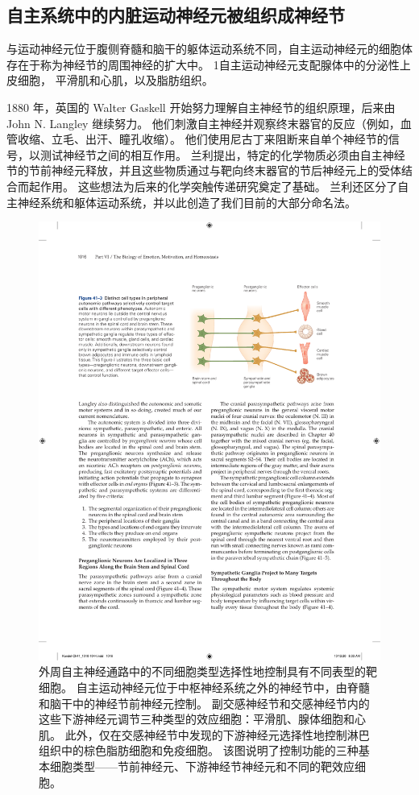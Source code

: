 \subsection{自主系统中的内脏运动神经元被组织成神经节}

与运动神经元位于腹侧脊髓和脑干的躯体运动系统不同，自主运动神经元的细胞体存在于称为神经节的周围神经的扩大中。
1自主运动神经元支配腺体中的分泌性上皮细胞， 平滑肌和心肌，以及脂肪组织。


1880 年，英国的 Walter Gaskell 开始努力理解自主神经节的组织原理，后来由 John N. Langley 继续努力。
他们刺激自主神经并观察终末器官的反应（例如，血管收缩、立毛、出汗、瞳孔收缩）。
他们使用尼古丁来阻断来自单个神经节的信号，以测试神经节之间的相互作用。
兰利提出，特定的化学物质必须由自主神经节的节前神经元释放，并且这些物质通过与靶向终末器官的节后神经元上的受体结合而起作用。
这些想法为后来的化学突触传递研究奠定了基础。
兰利还区分了自主神经系统和躯体运动系统，并以此创造了我们目前的大部分命名法。


\begin{figure}[htbp]
	\centering
	\includegraphics[width=0.6\linewidth]{chap41/fig_41_3}
	\caption{外周自主神经通路中的不同细胞类型选择性地控制具有不同表型的靶细胞。 自主运动神经元位于中枢神经系统之外的神经节中，由脊髓和脑干中的神经节前神经元控制。 副交感神经节和交感神经节内的这些下游神经元调节三种类型的效应细胞：平滑肌、腺体细胞和心肌。 此外，仅在交感神经节中发现的下游神经元选择性地控制淋巴组织中的棕色脂肪细胞和免疫细胞。 该图说明了控制功能的三种基本细胞类型——节前神经元、下游神经节神经元和不同的靶效应细胞。}
	\label{fig:41_3}
\end{figure}


